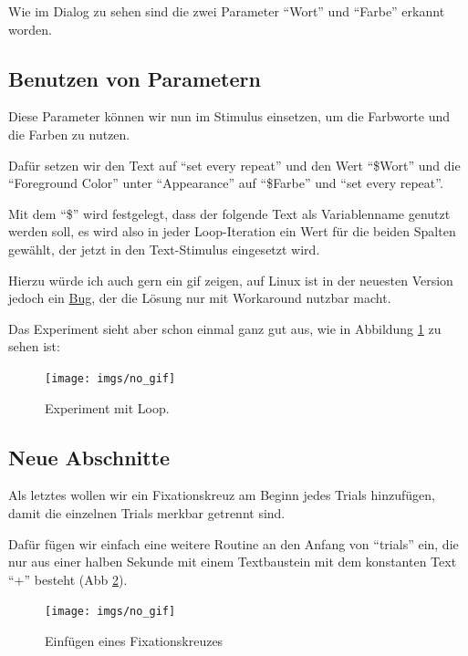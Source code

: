 \documentclass[
]{book}
\begin{document}
Wie im Dialog zu sehen sind die zwei Parameter ``Wort'' und ``Farbe'' erkannt worden.

\hypertarget{benutzen-von-parametern}{%
\subsection{Benutzen von Parametern}\label{benutzen-von-parametern}}

Diese Parameter können wir nun im Stimulus einsetzen, um die Farbworte und die Farben zu nutzen.

Dafür setzen wir den Text auf ``set every repeat'' und den Wert ``\$Wort'' und die ``Foreground Color'' unter ``Appearance'' auf ``\$Farbe'' und ``set every repeat''.

Mit dem ``\$'' wird festgelegt, dass der folgende Text als Variablenname genutzt werden soll, es wird also in jeder Loop-Iteration ein Wert für die beiden Spalten gewählt, der jetzt in den Text-Stimulus eingesetzt wird.

Hierzu würde ich auch gern ein gif zeigen, auf Linux ist in der neuesten Version jedoch ein \href{https://github.com/psychopy/psychopy/issues/4207}{Bug}, der die Lösung nur mit Workaround nutzbar macht.

Das Experiment sieht aber schon einmal ganz gut aus, wie in Abbildung \ref{fig:step6} zu sehen ist:



\begin{figure}

{\centering \texttt{[image: imgs/no\_gif]} 

}

\caption{Experiment mit Loop.}\label{fig:step6}
\end{figure}

\hypertarget{neue-abschnitte}{%
\subsection{Neue Abschnitte}\label{neue-abschnitte}}

Als letztes wollen wir ein Fixationskreuz am Beginn jedes Trials hinzufügen, damit die einzelnen Trials merkbar getrennt sind.

Dafür fügen wir einfach eine weitere Routine an den Anfang von ``trials'' ein, die nur aus einer halben Sekunde mit einem Textbaustein mit dem konstanten Text ``+'' besteht (Abb \ref{fig:step7}).



\begin{figure}

{\centering \texttt{[image: imgs/no\_gif]} 

}

\caption{Einfügen eines Fixationskreuzes}\label{fig:step7}
\end{figure}
\end{document}
